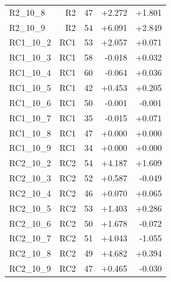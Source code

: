 \begin{longtable}{@{}lrrrr@{}}
R2\_10\_8 & R2 & 47 & +2.272 & +1.801 \\
R2\_10\_9 & R2 & 54 & +6.091 & +2.849 \\
RC1\_10\_2 & RC1 & 53 & +2.057 & +0.071 \\
RC1\_10\_3 & RC1 & 58 & -0.018 & +0.032 \\
RC1\_10\_4 & RC1 & 60 & -0.064 & +0.036 \\
RC1\_10\_5 & RC1 & 42 & +0.453 & +0.205 \\
RC1\_10\_6 & RC1 & 50 & -0.001 & -0.001 \\
RC1\_10\_7 & RC1 & 35 & -0.015 & +0.071 \\
RC1\_10\_8 & RC1 & 47 & +0.000 & +0.000 \\
RC1\_10\_9 & RC1 & 34 & +0.000 & +0.000 \\
RC2\_10\_2 & RC2 & 54 & +4.187 & +1.609 \\
RC2\_10\_3 & RC2 & 52 & +0.587 & -0.049 \\
RC2\_10\_4 & RC2 & 46 & +0.070 & +0.065 \\
RC2\_10\_5 & RC2 & 53 & +1.403 & +0.286 \\
RC2\_10\_6 & RC2 & 50 & +1.678 & -0.072 \\
RC2\_10\_7 & RC2 & 51 & +4.043 & -1.055 \\
RC2\_10\_8 & RC2 & 49 & +4.682 & +0.394 \\
RC2\_10\_9 & RC2 & 47 & +0.465 & -0.030 \\
\bottomrule
\end{longtable}
\endgroup
